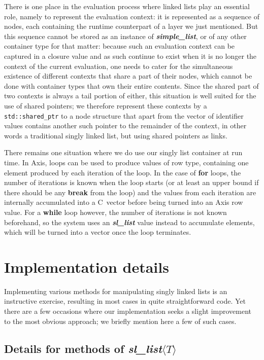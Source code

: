 \documentclass[12pt]{article}
\theoremstyle{plain}
\theoremstyle{definition}
\def\PP{\copy\PPbox}
\newcommand\Cee{\textsc{C}}
\newcommand\Cpp{\Cee\PP}
\newcommand\std[1]{\texttt{std::#1}}
\def\slls.{\textbf{\textit{sl\_\!list}}}
\def\smpl.{\textbf{\textit{simple\_\!list}}}
\begin{document}
There is one place in the evaluation process where linked lists play an
essential role, namely to represent the evaluation context: it is represented as
a sequence of nodes, each containing the runtime counterpart of a layer we just
mentioned. But this sequence cannot be stored as an instance of \smpl., or of
any other container type for that matter: because such an evaluation context can
be captured in a closure value and as such continue to exist when it is no
longer the context of the current evaluation, one needs to cater for the
simultaneous existence of different contexts that share a part of their nodes,
which cannot be done with container types that own their entire contents. Since
the shared part of two contexts is always a tail portion of either, this
situation is well suited for the use of shared pointers; we therefore represent
these contexts by a \std{shared\_ptr} to a node structure that apart from the
vector of identifier values contains another such pointer to the remainder of
the context, in other words a traditional singly linked list, but using shared
pointers as links.

There remains one situation where we do use our singly list container at run
time. In Axis, loops can be used to produce values of row type, containing one
element produced by each iteration of the loop. In the case of \textbf{for}
loops, the number of iterations is known when the loop starts (or at least an
upper bound if there should be any \textbf{break} from the loop) and the values
from each iteration are internally accumulated into a \Cpp~vector before being
turned into an Axis row value. For a \textbf{while} loop however, the number of
iterations is not known beforehand, so the system uses an \slls. value instead
to accumulate elements, which will be turned into a vector once the loop
terminates.

\section{Implementation details}

Implementing various methods for manipulating singly linked lists is an
instructive exercise, resulting in most cases in quite straightforward code. Yet
there are a few occasions where our implementation seeks a slight improvement to
the most obvious approach; we briefly mention here a few of such cases.

\subsection{Details for methods of \textbf{\textit{sl\_list}}$\langle T\rangle$}
\end{document}
